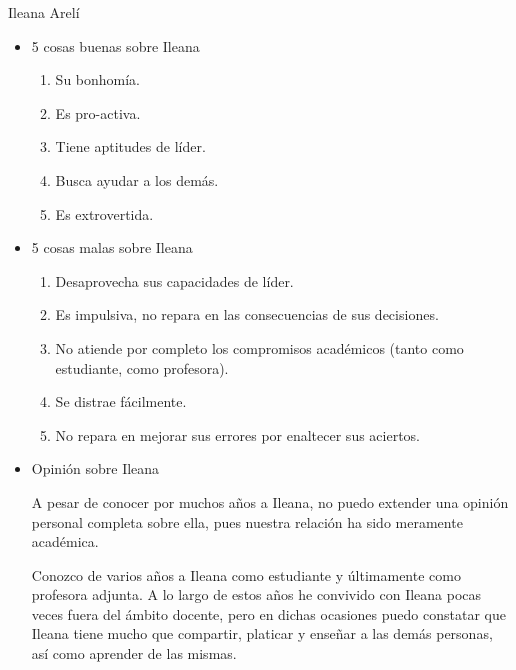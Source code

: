 \documentclass[12pt]{report}
\numberwithin{section}{chapter}
\begin{document}
Ileana Arelí
\begin{itemize}
\item 5 cosas buenas sobre Ileana
\begin{enumerate}
\item Su bonhomía.
\item Es pro-activa.
\item Tiene aptitudes de líder.
\item Busca ayudar a los demás.
\item Es extrovertida.
\end{enumerate}
\vspace{1cm}

\item 5 cosas malas sobre Ileana
\begin{enumerate}
\item Desaprovecha sus capacidades de líder.
\item Es impulsiva, no repara en las consecuencias de sus decisiones.
\item No atiende por completo los compromisos académicos (tanto como estudiante, como profesora).
\item Se distrae fácilmente.
\item No repara en mejorar sus errores por enaltecer sus aciertos.
\end{enumerate}
\vspace{1cm}

\item Opinión sobre Ileana

A pesar de conocer por muchos años a Ileana, no puedo extender una opinión personal completa sobre ella, pues nuestra relación ha sido meramente académica.

Conozco de varios años a Ileana como estudiante y últimamente como profesora adjunta. A lo largo de estos años he convivido con Ileana pocas veces fuera del ámbito docente, pero en dichas ocasiones puedo constatar que Ileana tiene mucho que compartir, platicar y enseñar a las demás personas, así como aprender de las mismas.
\end{itemize}
\end{document}
